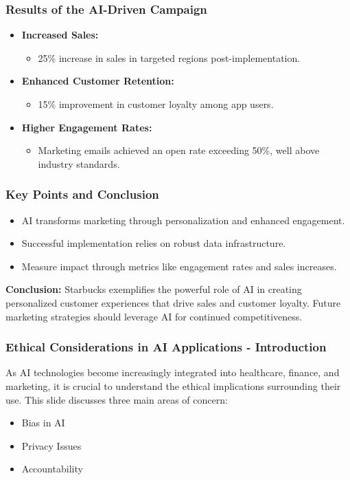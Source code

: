 \documentclass{beamer}
\begin{document}
\begin{frame}[fragile]
    \frametitle{Results of the AI-Driven Campaign}
    \begin{itemize}
        \item \textbf{Increased Sales:} 
            \begin{itemize}
                \item 25\% increase in sales in targeted regions post-implementation.
            \end{itemize}
        \item \textbf{Enhanced Customer Retention:}
            \begin{itemize}
                \item 15\% improvement in customer loyalty among app users.
            \end{itemize}
        \item \textbf{Higher Engagement Rates:}
            \begin{itemize}
                \item Marketing emails achieved an open rate exceeding 50\%, well above industry standards.
            \end{itemize}
    \end{itemize}
\end{frame}

\begin{frame}[fragile]
    \frametitle{Key Points and Conclusion}
    \begin{itemize}
        \item AI transforms marketing through personalization and enhanced engagement.
        \item Successful implementation relies on robust data infrastructure.
        \item Measure impact through metrics like engagement rates and sales increases.
    \end{itemize}
    
    \textbf{Conclusion:} Starbucks exemplifies the powerful role of AI in creating personalized customer experiences that drive sales and customer loyalty. Future marketing strategies should leverage AI for continued competitiveness.
\end{frame}

\begin{frame}[fragile]
    \frametitle{Ethical Considerations in AI Applications - Introduction}
    As AI technologies become increasingly integrated into healthcare, finance, and marketing, it is crucial to understand the ethical implications surrounding their use. This slide discusses three main areas of concern: 
    \begin{itemize}
        \item Bias in AI
        \item Privacy Issues
        \item Accountability
    \end{itemize}
\end{frame}
\end{document}

